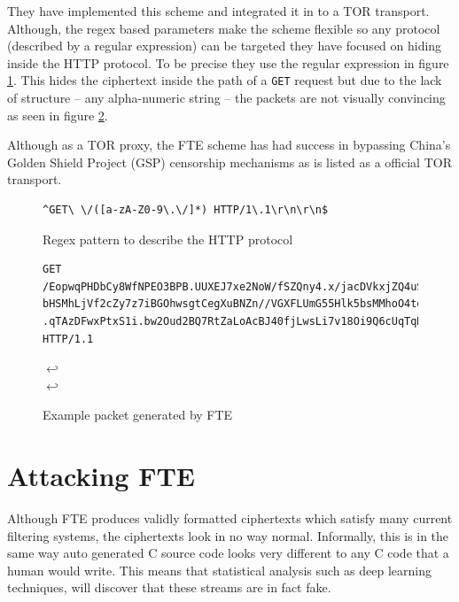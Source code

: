 \documentclass[ %
                    author={Samuel Russell},
                supervisor={Prof. Bogdan Warinschi},
                    degree={MEng},
                     title={Innocuous Ciphertexts},
                  subtitle={The DE-CENSOR Scheme},
                      type={research},
                      year={2018} ]{dissertation}
\begin{document}
They have implemented this scheme and integrated it in to a TOR transport. Although, the regex based parameters make the scheme flexible so any protocol (described by a regular expression) can be targeted they have focused on hiding inside the HTTP protocol. To be precise they use the regular expression in figure \ref{fig:http-regex}. This hides the ciphertext inside the path of a \texttt{GET} request but due to the lack of structure -- any alpha-numeric string -- the packets are not visually convincing as seen in figure \ref{fig:http-ex}.

Although as a TOR proxy, the FTE scheme has had success in bypassing China's Golden Shield Project (GSP) censorship mechanisms as is listed as a official TOR transport.

\begin{figure}[h]
\begin{verbatim}
^GET\ \/([a-zA-Z0-9\.\/]*) HTTP/1\.1\r\n\r\n$
\end{verbatim}
\caption{Regex pattern to describe the HTTP protocol}
\label{fig:http-regex}
\end{figure}


\begin{figure}[h]
\begin{verbatim}
GET /EopwqPHDbCy8WfNPEO3BPB.UUXEJ7xe2NoW/fSZQny4.x/jacDVkxjZQ4uSqgZu7.N2AGbaYeFqr/DEh
bHSMhLjVf2cZy7z7iBGOhwsgtCegXuBNZn//VGXFLUmG55Hlk5bsMMhoO4tqF.mYApGxAd2c0G/goOnZLivQB
.qTAzDFwxPtxS1i.bw2Oud2BQ7RtZaLoAcBJ40fjLwsLi7v18Oi9Q6cUqTqHKTMsVWijB9/kh HTTP/1.1
\end{verbatim}
$\hookleftarrow$\\
$\hookleftarrow$
\caption{Example packet generated by FTE}
\label{fig:http-ex}
\end{figure}




\section{Attacking FTE}\label{attacking_fte}

Although FTE produces validly formatted ciphertexts which satisfy many current filtering systems, the ciphertexts look in no way normal.
Informally, this is in the same way auto generated C source code looks very different to any C code that a human would write.
This means that statistical analysis such as deep learning techniques, will discover that these streams are in fact fake.
\end{document}
